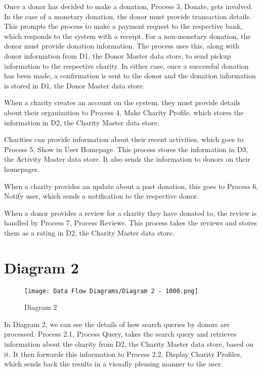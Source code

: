 \documentclass{scrreprt}
\begin{document}
        Once a donor has decided to make a donation, Process 3, Donate, gets involved. In the case of a monetary donation, the donor must provide transaction details. This prompts the process to make a payment request to the respective bank, which responds to the system with a receipt. For a non-monetary donation, the donor must provide donation information. The process uses this, along with donor information from D1, the Donor Master data store, to send pickup information to the respective charity. In either case, once a successful donation has been made, a confirmation is sent to the donor and the donation information is stored in D1, the Donor Master data store.\par
        
        When a charity creates an account on the system, they must provide details about their organization to Process 4, Make Charity Profile, which stores the information in D2, the Charity Master data store.\par
        
        Charities can provide information about their recent activities, which goes to Process 5, Show in User Homepage. This process stores the information in D3, the Activity Master data store. It also sends the information to donors on their homepages.\par
        
        When a charity provides an update about a past donation, this goes to Process 6, Notify user, which sends a notification to the respective donor.\par
        
        When a donor provides a review for a charity they have donated to, the review is handled by Process 7, Process Reviews. This process takes the reviews and stores them as a rating in D2, the Charity Master data store.
    
    \section{Diagram 2}
    
        \begin{figure}[H]
            \centering
            \texttt{[image: Data Flow Diagrams/Diagram 2 - 1000.png]}
            {\caption*{Diagram 2}}
        \end{figure}
        
        In Diagram 2, we can see the details of how search queries by donors are processed. Process 2.1, Process Query, takes the search query and retrieves information about the charity from D2, the Charity Master data store, based on it. It then forwards this information to Process 2.2, Display Charity Profiles, which sends back the results in a visually pleasing manner to the user.
        
\end{document}
